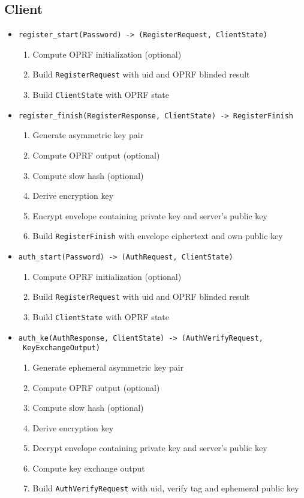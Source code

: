 \documentclass[../report.tex]{subfiles}
\begin{document}
\subsection{Client}
\begin{itemize}
 \item \verb|register_start(Password) -> (RegisterRequest, ClientState)|
  \begin{enumerate}
    \item Compute OPRF initialization (optional)
    \item Build \verb|RegisterRequest| with uid and OPRF blinded result
    \item Build \verb|ClientState| with OPRF state
  \end{enumerate}
  
 \item \verb|register_finish(RegisterResponse, ClientState) -> RegisterFinish|
  \begin{enumerate}
    \item Generate asymmetric key pair
    \item Compute OPRF output (optional)
    \item Compute slow hash (optional)
    \item Derive encryption key
    \item Encrypt envelope containing private key and server's public key
    \item Build \verb|RegisterFinish| with envelope ciphertext and own public key
  \end{enumerate}
 
 
 
 \item \verb|auth_start(Password) -> (AuthRequest, ClientState)|
   \begin{enumerate}
    \item Compute OPRF initialization (optional)
    \item Build \verb|RegisterRequest| with uid and OPRF blinded result
    \item Build \verb|ClientState| with OPRF state
  \end{enumerate}
  
 \item \verb|auth_ke(AuthResponse, ClientState) -> (AuthVerifyRequest,|\\
       \verb| KeyExchangeOutput)|
  \begin{enumerate}
    \item Generate ephemeral asymmetric key pair
    \item Compute OPRF output (optional)
    \item Compute slow hash (optional)
    \item Derive encryption key
    \item Decrypt envelope containing private key and server's public key
    \item Compute key exchange output
    \item Build \verb|AuthVerifyRequest| with uid, verify tag and ephemeral public key
  \end{enumerate}
 

\end{itemize}
\end{document}
